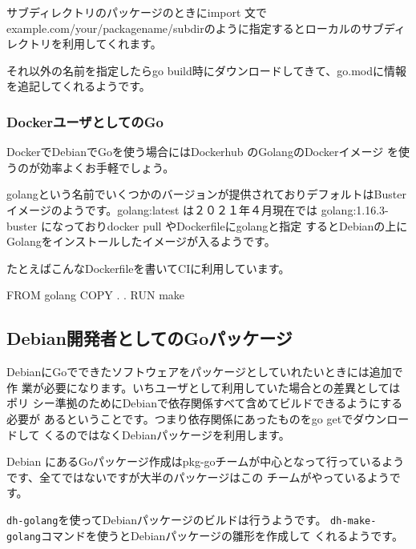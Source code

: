 \documentclass[mingoth,a4paper]{jsarticle}
\begin{document}
サブディレクトリのパッケージのときにimport 文で
example.com/your/packagename/subdirのように指定するとローカルのサブディ
レクトリを利用してくれます。

それ以外の名前を指定したらgo build時にダウンロードしてきて、go.modに情報
を追記してくれるようです。

\subsubsection{DockerユーザとしてのGo}

DockerでDebianでGoを使う場合にはDockerhub のGolangのDockerイメージ
\cite{docker:go}を使うのが効率よくお手軽でしょう。

golangという名前でいくつかのバージョンが提供されておりデフォルトはBuster
イメージのようです。golang:latest は２０２１年４月現在では
golang:1.16.3-buster になっておりdocker pull やDockerfileにgolangと指定
するとDebianの上にGolangをインストールしたイメージが入るようです。

たとえばこんなDockerfileを書いてCIに利用しています。

\begin{commandline}
FROM golang
COPY . .
RUN make
\end{commandline}


\subsection{Debian開発者としてのGoパッケージ}

DebianにGoでできたソフトウェアをパッケージとしていれたいときには追加で作
業が必要になります。いちユーザとして利用していた場合との差異としてはポリ
シー準拠のためにDebianで依存関係すべて含めてビルドできるようにする必要が
あるということです。つまり依存関係にあったものをgo getでダウンロードして
くるのではなくDebianパッケージを利用します。

Debian にあるGoパッケージ作成はpkg-goチームが中心となって行っているよう
です\cite{debian-go-packaging}、全てではないですが大半のパッケージはこの
チームがやっているようです。

\texttt{dh-golang}を使ってDebianパッケージのビルドは行うようです。
\texttt{dh-make-golang}コマンドを使うとDebianパッケージの雛形を作成して
くれるようです。
\end{document}
